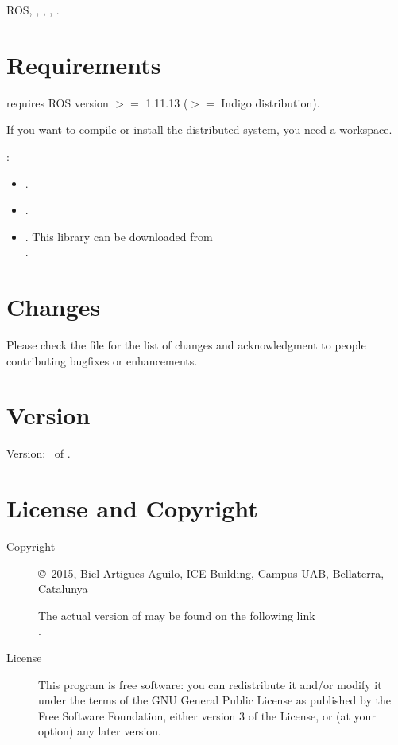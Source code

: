 \documentclass[a4paper,english]{article}
\begin{document}
ROS, , , , .


\section{Requirements}

\begin{description}\setlength{\itemsep}{0cm}
\item[ROS Environment]  requires ROS version $>=$ 1.11.13 ($>=$ Indigo distribution).
\item[ROS Workspace] If you want to compile or install the distributed system, you need a  workspace.
\item[Libraries]: 
	\begin{itemize}
		\item {}.
		\item {}.
		\item {}. This library can be downloaded from \\ .
	\end{itemize}
\end{description}

\section{Changes}
Please check the file  for the list of changes and
acknowledgment to people contributing bugfixes or enhancements.

\section{Version}

Version: \Version\ of \Date.

\section{License and Copyright}

\begin{description}
\item[Copyright] \copyright\ 2015, Biel Artigues Aguilo,
     ICE Building, Campus UAB, Bellaterra, Catalunya\\


     The actual version of   may be found on the following link\\
     .

\item[License] This program is free software: you can redistribute it and/or modify
    it under the terms of the GNU General Public License as published by
    the Free Software Foundation, either version 3 of the License, or
    (at your option) any later version.

\end{description}
\end{document}
